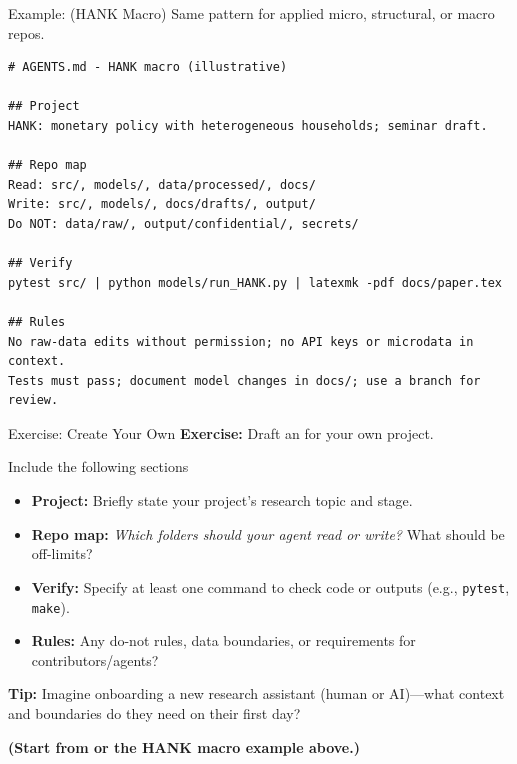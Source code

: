 \begin{frame}[fragile,t,shrink=5]{Example:  (HANK Macro)}
  {\footnotesize Same pattern for applied micro, structural, or macro repos.}
  \vspace{0.2em}
  \begin{lstlisting}[basicstyle=\ttfamily, frame=single, backgroundcolor=\color{coursebg}]
# AGENTS.md - HANK macro (illustrative)

## Project
HANK: monetary policy with heterogeneous households; seminar draft.

## Repo map
Read: src/, models/, data/processed/, docs/
Write: src/, models/, docs/drafts/, output/
Do NOT: data/raw/, output/confidential/, secrets/

## Verify
pytest src/ | python models/run_HANK.py | latexmk -pdf docs/paper.tex

## Rules
No raw-data edits without permission; no API keys or microdata in context.
Tests must pass; document model changes in docs/; use a branch for review.
  \end{lstlisting}
\end{frame}


\begin{frame}{Exercise: Create Your Own }
  \textbf{Exercise:} Draft an  for your own project.
  \vspace{1em}

  \begin{block}{Include the following sections}
    \begin{itemize}
      \item \textbf{Project:} Briefly state your project's research topic and stage.
      \item \textbf{Repo map:} \textit{Which folders should your agent read or write?} What should be off-limits?
      \item \textbf{Verify:} Specify at least one command to check code or outputs (e.g., \texttt{pytest}, \texttt{make}).
      \item \textbf{Rules:} Any do-not rules, data boundaries, or requirements for contributors/agents?
    \end{itemize}
  \end{block}

  \vspace{.5em}
  {\small
    \textbf{Tip:} Imagine onboarding a new research assistant (human or AI)---what context and boundaries do they need on their first day?}

  \vspace{1em}
  \textbf{(Start from  or the HANK macro example above.)}
\end{frame}


